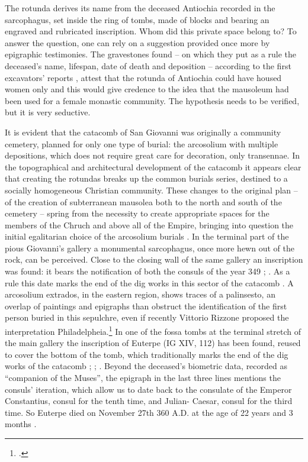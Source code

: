 \documentclass[amsthm,ebook]{saparticle}
\begin{document}
The rotunda derives its name from the deceased Antiochia recorded in the sarcophagus, set inside the ring of tombs, made of blocks and bearing an engraved and rubricated inscription. Whom did this private space belong to? To answer the question, one can rely on a suggestion provided once more by epigraphic testimonies. The gravestones found – on which they put as a rule the deceased’s name, lifespan, date of death and deposition – according to the first excavators’ reports \citep[23-45]{CARINI1873}, attest that the rotunda of Antiochia could have housed women only and this would give credence to the idea that the mausoleum had been used for a female monastic community. The hypothesis needs to be verified, but it is very seductive.

It is evident that the catacomb of San Giovanni was originally a community cemetery, planned for only one type of burial: the arcosolium with multiple depositions, which does not require great care for decoration, only transennae. In the topographical and architectural development of the catacomb it appears clear that creating the rotundas breaks up the common burials series, destined to a socially homogeneous Christian community. These changes to the original plan – of the creation of subterranean mausolea both to the north and south of the cemetery – spring from the necessity to create appropriate spaces for the members of the Chruch and above all of the Empire, bringing into question the initial egalitarian choice of the arcosolium burials \citep[767]{GRIESHEIMER1989}. In the terminal part of the pious Giovanni’s gallery a monumental sarcophagus, once more hewn out of the rock, can be perceived. Close to the closing wall of the same gallery an inscription was found: it bears the notification of both the consuls of the year 349 %
; \citep[89]{AGNELLO1953}. As a rule this date marks the end of the dig works in this sector of the catacomb \citep[75-76]{FERRUA1952}. A arcosolium extrados, in the eastern region, shows traces of a palinsesto, an overlap of paintings and epigraphs than obstruct the identification of the first person buried in this sepulchre, even if recently Vittorio Rizzone proposed the interpretation Philadelpheia.\footnote{\citet[45-48]{RIZZONE2012}.} In one of the fossa tombs at the terminal stretch of the main gallery the inscription of Euterpe (IG XIV, 112) has been found, reused to cover the bottom of the tomb, which traditionally marks the end of the dig works of the catacomb \citep[75-76]{FERRUA1952}; \citep[79]{AGNELLO1958}; \citep[781]{GRIESHEIMER1989}. Beyond the deceased’s biometric data, recorded as ``companion of the Muses'', the epigraph in the last three lines mentions the consuls’ iteration, which allow us to date back to the consulate of the Emperor Constantius, consul for the tenth time, and Julian- Caesar, consul for the third time. So Euterpe died on November 27th 360 A.D. at the age of 22 years and 3 months \citep[524-526]{GUARDUCCI1978}.
\end{document}
